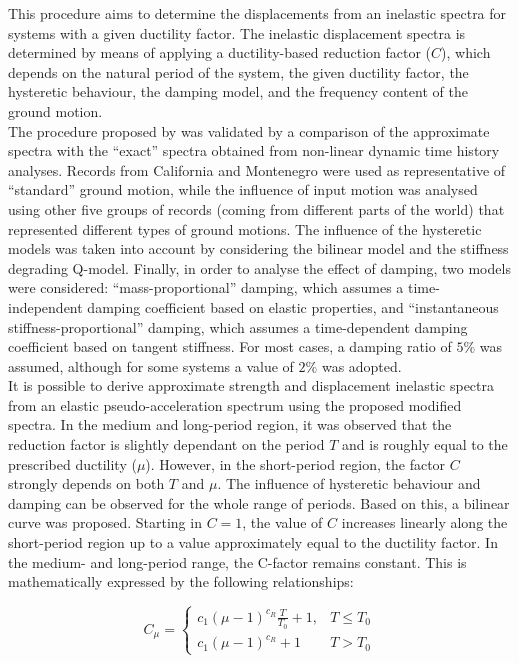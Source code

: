This procedure aims to determine the displacements from an inelastic spectra for systems with a given ductility factor. The inelastic displacement spectra is determined by means of applying a ductility-based reduction factor ($C$), which depends on the natural period of the system, the given ductility factor, the hysteretic behaviour, the damping model, and the frequency content of the ground motion.\\
The procedure proposed by \citep{VidicEtAl1994} was validated by a comparison of the approximate spectra with the “exact” spectra obtained from non-linear dynamic time history analyses. Records from California and Montenegro were used as representative of “standard” ground motion, while the influence of input motion was analysed using other five groups of records (coming from different parts of the world) that represented different types of ground motions. The influence of the hysteretic models was taken into account by considering the bilinear model and the stiffness degrading Q-model. Finally, in order to analyse the effect of damping, two models were considered: “mass-proportional” damping, which assumes a time-independent damping coefficient based on elastic properties, and “instantaneous stiffness-proportional” damping, which assumes a time-dependent damping coefficient based on tangent stiffness. For most cases, a damping ratio of $5\%$ was assumed, although for some systems a value of $2\%$ was adopted.\\

It is possible to derive approximate strength and displacement inelastic spectra from an elastic pseudo-acceleration spectrum using the proposed modified spectra. In the medium and long-period region, it was observed that the reduction factor is slightly dependant on the period $T$ and is roughly equal to the prescribed ductility ($\mu$). However, in the short-period region, the factor $C$ strongly depends on both $T$ and $\mu$. The influence of hysteretic behaviour and damping can be observed for the whole range of periods. Based on this, a bilinear curve was proposed. Starting in $C = 1$, the value of $C$ increases linearly along the short-period region up to a value approximately equal to the ductility factor. In the medium- and long-period range, the C-factor remains constant. This is mathematically expressed by the following relationships:


\begin{equation}
C_\mu = \left\{
\begin{matrix}
  c_{1}\left(\mu-1\right)^{c_{R}}\frac{T}{T_{0}} + 1, & T\leq T_{0}  \\
  c_{1}\left(\mu-1\right)^{c_{R}} + 1 & T>T_{0}
 \end{matrix}
 \right.
\end{equation}

